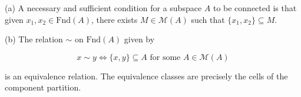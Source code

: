 (a) A necessary and sufficient condition for a subspace $A$ to be connected is that given $x_1, x_2 \in \text{Fnd}(A)$, there exists $M \in \mathcal{M}(A)$ such that $\{x_1, x_2\} \subseteq M$.

(b) The relation $\sim$ on $\text{Fnd}(A)$ given by

$$x \sim y \Leftrightarrow \{x, y\} \subseteq A \text{ for some } A \in \mathcal{M}(A)$$

is an equivalence relation. The equivalence classes are precisely the cells of the component partition.
